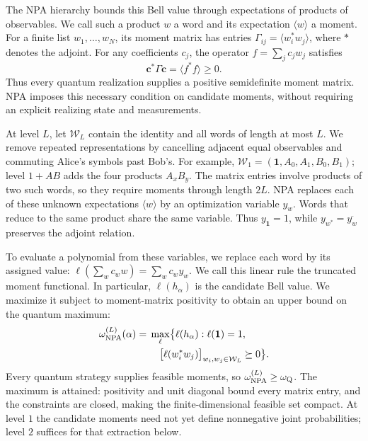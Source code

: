 \documentclass[aps,prl,twocolumn,10pt,superscriptaddress,nofootinbib,longbibliography,nobalancelastpage]{revtex4-2}
\newcommand{\id}{\mathbf 1}
\begin{document}
The NPA hierarchy bounds this Bell value through expectations of products of observables. We call such a product $w$ a word and its expectation $\langle w\rangle$ a moment. For a finite list $w_1,\ldots,w_N$, its moment matrix has entries $\Gamma_{ij}=\langle w_i^*w_j\rangle$, where $*$ denotes the adjoint. For any coefficients $c_j$, the operator $f=\sum_jc_jw_j$ satisfies
\[
\bm c^*\Gamma\bm c=\langle f^*f\rangle\geq0.
\]
Thus every quantum realization supplies a positive semidefinite moment matrix. NPA imposes this necessary condition on candidate moments, without requiring an explicit realizing state and measurements.

At level $L$, let $\mathcal W_L$ contain the identity and all words of length at most $L$. We remove repeated representations by cancelling adjacent equal observables and commuting Alice's symbols past Bob's. For example, $\mathcal W_1=(\id,A_0,A_1,B_0,B_1)$; level $1+AB$ adds the four products $A_xB_y$. The matrix entries involve products of two such words, so they require moments through length $2L$. NPA replaces each of these unknown expectations $\langle w\rangle$ by an optimization variable $y_w$. Words that reduce to the same product share the same variable. Thus $y_{\id}=1$, while $y_{w^*}=\overline{y_w}$ preserves the adjoint relation.

To evaluate a polynomial from these variables, we replace each word by its assigned value: $\ell(\sum_wc_ww)=\sum_wc_wy_w$. We call this linear rule the truncated moment functional. In particular, $\ell(h_\alpha)$ is the candidate Bell value. We maximize it subject to moment-matrix positivity to obtain an upper bound on the quantum maximum:
\begin{equation}
\begin{aligned}
\omega_{\rm NPA}^{(L)}(\alpha)={}&\max_{\ell}\bigl\{\ell(h_\alpha):\ell(\id)=1,\\
&\quad\bigl[\ell(w_i^*w_j)\bigr]_{w_i,w_j\in\mathcal W_L}\succeq0\bigr\}.
\end{aligned}
\label{eq:level}
\end{equation}
Every quantum strategy supplies feasible moments, so $\omega_{\rm NPA}^{(L)}\geq\omega_{\rm Q}$. The maximum is attained: positivity and unit diagonal bound every matrix entry, and the constraints are closed, making the finite-dimensional feasible set compact. At level $1$ the candidate moments need not yet define nonnegative joint probabilities; level $2$ suffices for that extraction below.
\end{document}
